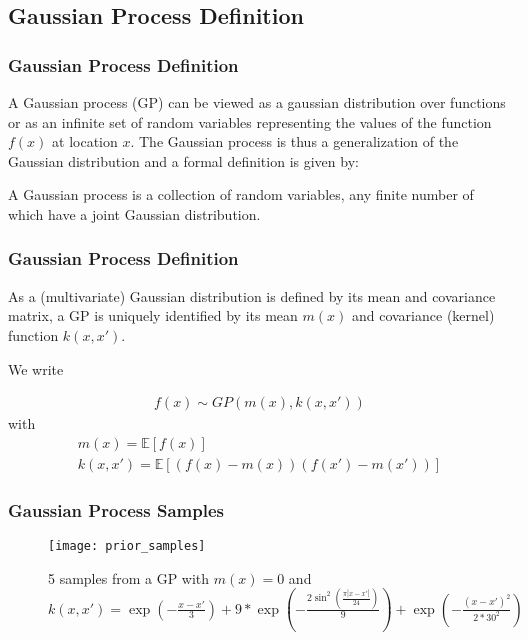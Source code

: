 \documentclass[
	9pt, %
]{beamer}
\begin{document}
\subsection{Gaussian Process Definition}

\begin{frame}
	\frametitle{Gaussian Process Definition}


A Gaussian process (GP) can be viewed as a gaussian distribution over functions or as an infinite set of random
variables representing the values of the function $f(x)$ at location $x$.
The Gaussian process is thus a generalization of the Gaussian distribution and a formal definition is given
by:

\begin{definition}\label{def:GP}
 A Gaussian process is a collection of random variables, any finite number of which have a joint Gaussian distribution.
\end{definition}

\end{frame}


\begin{frame}
	\frametitle{Gaussian Process Definition}

As a (multivariate) Gaussian distribution is defined by its mean and covariance matrix, a GP is
uniquely identified by its mean $m(x)$ and covariance (kernel) function $k(x,x')$.

We write

\begin{gather*}
    f(x) \sim GP(m(x), k(x,x'))
\end{gather*}
with
\begin{gather*}
    m(x) = \mathbb{E}[f(x)] \\
    k(x,x') = \mathbb{E}[(f(x)-m(x))(f(x')-m(x'))]
\end{gather*}
\end{frame}


\begin{frame}
	\frametitle{Gaussian Process Samples}

	\begin{figure}
			\texttt{[image: prior\_samples]}
			\caption{5 samples from a GP with $m(x)=0$  and $k(x,x') = \exp(-\frac{x-x'}{3}) +
			9 * \exp(-\frac{2 \sin^2(\frac{\pi |x -x'|}{24})}{9}) + \exp(-\frac{(x-x')^2}{2 * 30^2}) $}
	\end{figure}


\end{frame}
\end{document}
